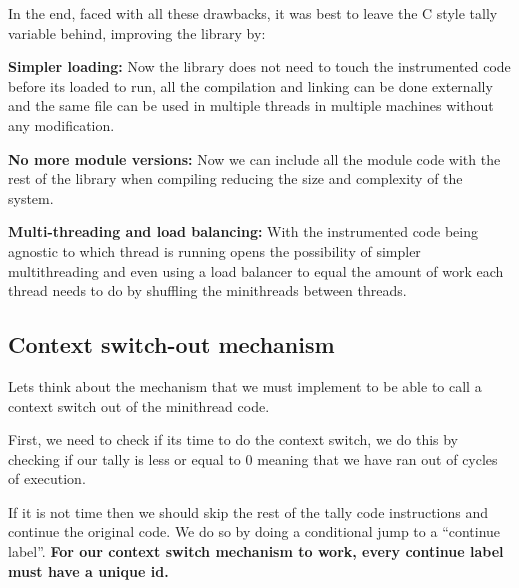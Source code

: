 \documentclass[12pt,a4paper]{report}
\newenvironment{tightcenter}{%
  \setlength\topsep{0pt}
  \setlength\parskip{0pt}
  \begin{center}
}{%
  \end{center}
}
\begin{document}
	In the end, faced with all these drawbacks, it was best to leave the C style tally variable behind, improving the library by:
	
	\textbf{Simpler loading:}
		Now the library does not need to touch the instrumented code before its loaded to run, all the compilation and linking can be done externally and the same file can be used in multiple threads in multiple machines without any modification.
		
	\textbf{No more module versions:}
		Now we can include all the module code with the rest of the library when compiling reducing the size and complexity of the system.
		
	\textbf{Multi-threading and load balancing:}
		With the instrumented code being agnostic to which thread is running opens the possibility of simpler multithreading and even using a load balancer to equal the amount of work each thread needs to do by shuffling the minithreads between threads.

\subsection{Context switch-out mechanism}

Let\textquotesingle s think about the mechanism that we must implement to be able to call a context switch out of the minithread code.

First, we need to check if its time to do the context switch, we do this by checking if our tally is less or equal to 0 meaning that we have ran out of cycles of execution.
\begin{tightcenter}


\end{tightcenter}
If it is not time then we should skip the rest of the tally code instructions and continue the original code. We do so by doing a conditional jump to a ``continue label''. \textbf{For our context switch mechanism to work, every continue label must have a unique id.}
\end{document}
